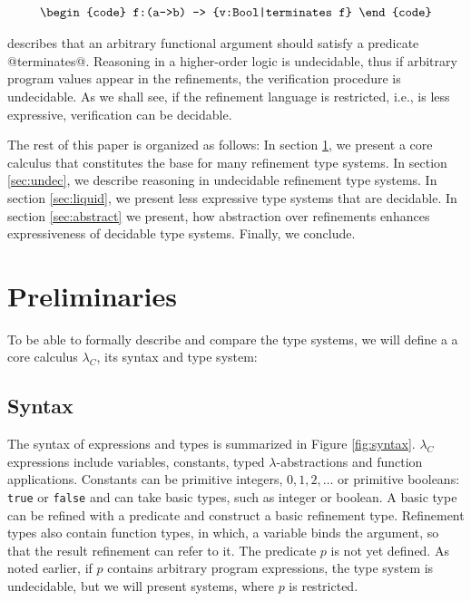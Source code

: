 $$\centering\begin{tabular}{c}\begin{code}
f:(a->b) -> {v:Bool|terminates f}
\end{code}\end{tabular}$$

describes that an arbitrary functional argument
should satisfy a predicate @terminates@.
%
Reasoning in a higher-order logic is undecidable, 
thus if arbitrary program values appear in the refinements,
the verification procedure is undecidable.
%
As we shall see, 
if the refinement language is restricted, i.e., is less expressive,
verification can be decidable.

The rest of this paper is organized as follows:
In section \ref{subsec:formal}, we present a core calculus
that constitutes the base for many refinement type systems.
In section \ref{sec:undec},
we describe reasoning in undecidable refinement type systems.
In section \ref{sec:liquid}, 
we present less expressive type systems
that are decidable.
In section \ref{sec:abstract} 
we present, how abstraction over refinements
enhances expressiveness of decidable type systems. 
Finally, we conclude.

\section{Preliminaries}\label{subsec:formal}

To be able to formally describe and compare the type systems, 
we will define a a core calculus $\lambda_C$, its syntax and type system:

\subsection{Syntax}
The syntax of expressions and types is summarized in Figure \ref{fig:syntax}.
$\lambda_C$ expressions include variables, constants,
typed $\lambda$-abstractions
and function applications. 
%
Constants can be primitive integers, 
$0, 1, 2, \dots$ or primitive booleans: \texttt{true} or \texttt{false}
and can take basic types, such as integer or boolean.
%
A basic type can be refined with a predicate and construct a basic
refinement type.
Refinement types also contain function types, 
in which, 
a variable binds the argument,
so that the result refinement can refer to it.  
%
The predicate $p$ is
not yet defined. 
As noted earlier, if $p$ contains arbitrary program 
expressions, the type system is undecidable, but we 
will present systems, where $p$ is restricted.

